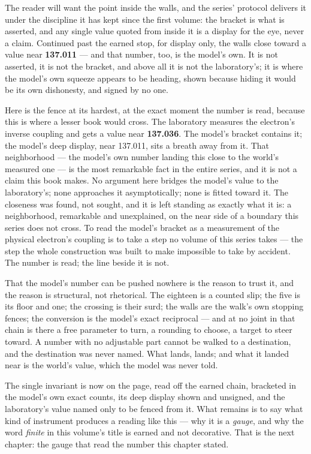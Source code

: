 The reader will want the point inside the walls, and the series' protocol
delivers it under the discipline it has kept since the first volume: the
bracket is what is asserted, and any single value quoted from inside it is
a display for the eye, never a claim. Continued past the earned stop, for
display only, the walls close toward a value near \textbf{137.011} --- and
that number, too, is the model's own. It is not asserted, it is not the
bracket, and above all it is not the laboratory's; it is where the model's
own squeeze appears to be heading, shown because hiding it would be its own
dishonesty, and signed by no one.

Here is the fence at its hardest, at the exact moment the number is read,
because this is where a lesser book would cross. The laboratory measures
the electron's inverse coupling and gets a value near \textbf{137.036}.
The model's bracket contains it; the model's deep display, near 137.011,
sits a breath away from it. That neighborhood --- the model's own number
landing this close to the world's measured one --- is the most remarkable
fact in the entire series, and it is not a claim this book makes. No
argument here bridges the model's value to the laboratory's; none
approaches it asymptotically; none is fitted toward it. The closeness was
found, not sought, and it is left standing as exactly what it is: a
neighborhood, remarkable and unexplained, on the near side of a boundary
this series does not cross. To read the model's bracket as a measurement
of the physical electron's coupling is to take a step no volume of this
series takes --- the step the whole construction was built to make
impossible to take by accident. The number is read; the line beside it is
not.

That the model's number can be pushed nowhere is the reason to trust it,
and the reason is structural, not rhetorical. The eighteen is a counted
slip; the five is its floor and one; the crossing is their surd; the walls
are the walk's own stopping fences; the conversion is the model's exact
reciprocal --- and at no joint in that chain is there a free parameter to
turn, a rounding to choose, a target to steer toward. A number with no
adjustable part cannot be walked to a destination, and the destination was
never named. What lands, lands; and what it landed near is the world's
value, which the model was never told.

The single invariant is now on the page, read off the earned chain,
bracketed in the model's own exact counts, its deep display shown and
unsigned, and the laboratory's value named only to be fenced from it. What
remains is to say what kind of instrument produces a reading like this ---
why it is a \emph{gauge}, and why the word \emph{finite} in this volume's
title is earned and not decorative. That is the next chapter: the gauge
that read the number this chapter stated.
